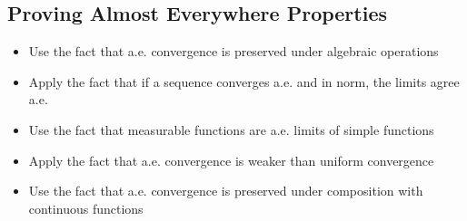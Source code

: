 \subsection*{Proving Almost Everywhere Properties}
\begin{itemize}
\item Use the fact that a.e. convergence is preserved under algebraic operations
\item Apply the fact that if a sequence converges a.e. and in norm, the limits agree a.e.
\item Use the fact that measurable functions are a.e. limits of simple functions
\item Apply the fact that a.e. convergence is weaker than uniform convergence
\item Use the fact that a.e. convergence is preserved under composition with continuous functions
\end{itemize}